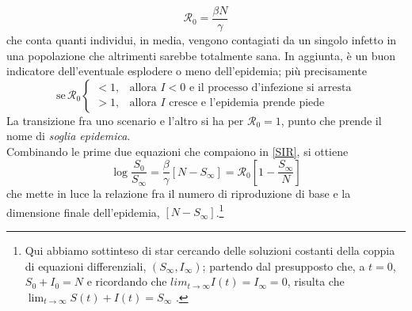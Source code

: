 \begin{equation}
\mathcal{R}_0 = \frac{\beta N}{\gamma}
\end{equation}
che conta quanti individui, in media, vengono contagiati da un singolo infetto in una popolazione che altrimenti sarebbe totalmente sana. In aggiunta, è un buon indicatore dell'eventuale esplodere o meno dell'epidemia; più precisamente
\[
\text{se} \,\mathcal{R}_0
\begin{cases}
< 1, & \text{allora $I < 0$ e il processo d'infezione si arresta}\\
> 1, & \text{allora $I$ cresce e l'epidemia prende piede}
\end{cases}
\]
La transizione fra uno scenario e l'altro si ha per $\mathcal{R}_0 = 1$, punto che prende il nome di \emph{soglia epidemica}. \\ Combinando le prime due equazioni \cite{Brauer} che compaiono in \eqref{SIR}, si ottiene
\begin{equation}
\log \frac{S_0}{S_\infty} = \frac{\beta}{\gamma} \left[ N - S_\infty \right ] = \mathcal{R}_0 \left[1 - \frac{S_\infty}{N} \right ]
\end{equation}
%
che mette in luce la relazione fra il numero di riproduzione di base e la dimensione finale dell'epidemia, $\left[ N - S_\infty \right ] $.\footnote{Qui abbiamo sottinteso di star cercando delle soluzioni costanti della coppia di equazioni differenziali, $ \left( S_\infty, I_\infty \right ) $; partendo dal presupposto che, a $ t = 0 $, $ S_0 + I_0 = N $ e ricordando che $ lim_{t\to \infty} I(t) = I_\infty = 0 $, risulta che $ \lim_{t\to \infty} S(t) + I(t) = S_\infty $ \cite{Brauer}.}

